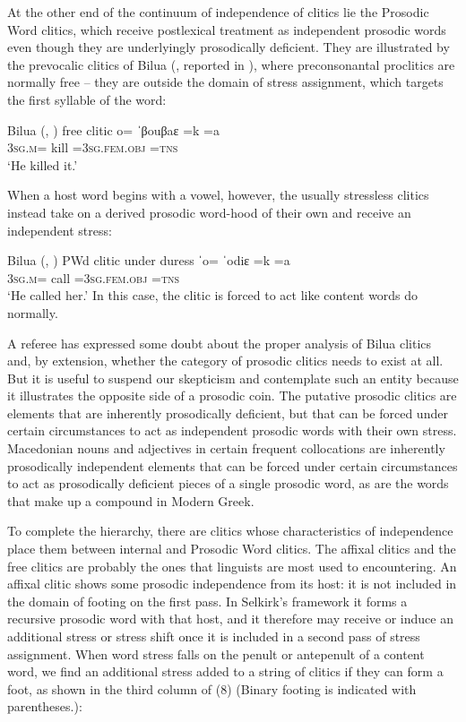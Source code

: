 \documentclass[output=paper,
modfonts
]{LSP/langsci}
\begin{document}
At the other end of the continuum of independence of clitics lie the Prosodic Word clitics, which receive postlexical treatment as independent prosodic words even though they are underlyingly prosodically deficient. They are illustrated by the prevocalic clitics of Bilua (\citealt{obata2003}, reported in \citealt{anderson2011}), where preconsonantal proclitics are normally free  --  they are outside the domain of stress assignment, which targets the first syllable of the word: 

\ea Bilua (\citealt{obata2003}, \citealt[2004]{anderson2011}) free clitic
	\ea \gll o=  {\squish ˈβouβaɛ} \squish=k \squish=a\\
	\textsc{3sg.m}= {\squish kill} \squish=\textsc{3sg.fem.obj} \squish\textsc{=tns}\\
	\glt ‘He killed it.’
	\z
\z

\noindent When a host word begins with a vowel, however, the usually stressless clitics instead take on a derived prosodic word-hood of their own and receive an independent stress: 

\ea Bilua (\citealt{obata2003}, \citealt{anderson2011}) PWd clitic under duress
	\ea \gll  ˈo=  {\squish ˈodiɛ} \squish=k \squish=a\\
	3\textsc{sg.m}=  {\squish call} \squish=\textsc{3sg.fem.obj} \squish\textsc{=tns}\\
	\glt  ‘He called her.’
	\z
\z
\noindent In this case, the clitic is forced to act like content words do normally.

A referee has expressed some doubt about the proper analysis of Bilua clitics and, by extension, whether the category of prosodic clitics needs to exist at all. But it is useful to suspend our skepticism and contemplate such an entity because it illustrates the opposite side of a prosodic coin. The putative prosodic clitics are elements that are inherently prosodically deficient, but that can be forced under certain circumstances to act as independent prosodic words with their own stress. Macedonian nouns and adjectives in certain frequent collocations are inherently prosodically independent elements that can be forced under certain circumstances to act as prosodically deficient pieces of a single prosodic word, as are the words that make up a compound in Modern Greek.

To complete the hierarchy, there are clitics whose characteristics of independence place them between internal and Prosodic Word clitics. The affixal clitics and the free clitics are probably the ones that linguists are most used to encountering. An affixal clitic shows some prosodic independence from its host: it is not included in the domain of footing on the first pass. In Selkirk’s framework it forms a recursive prosodic word with that host, and it therefore may receive or induce an additional stress or stress shift once it is included in a second pass of stress assignment. When word stress falls on the penult or antepenult of a content word, we find an additional stress added to a string of clitics if they can form a foot, as shown in the third column of (8) (Binary footing is indicated with parentheses.):
\end{document}
